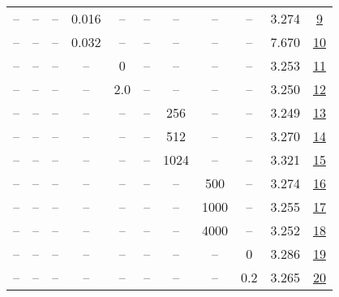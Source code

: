 \begin{table}[H]
\begin{tabular}{ccccccccccc}
-- & -- & -- & 0.016 & -- & -- & -- & -- & -- & 3.274 & \href{https://wandb.ai/stanford-mercury/optimizer-scaling/runs/sweep-130m-21B-nadamwa4d8belr0.016-wd0.1-minlr0-warmup2000-b10.9-d5c520}{9} \\
-- & -- & -- & 0.032 & -- & -- & -- & -- & -- & 7.670 & \href{https://wandb.ai/stanford-mercury/optimizer-scaling/runs/sweep-130m-21B-nadamwe5520alr0.032-wd0.1-minlr0-warmup2000-b10.9-07e730}{10} \\
-- & -- & -- & -- & 0 & -- & -- & -- & -- & 3.253 & \href{https://wandb.ai/stanford-mercury/optimizer-scaling/runs/sweep-130m-21B-nadamw3e1122lr0.008-wd0.1-minlr0-warmup2000-b10.9-046f4c}{11} \\
-- & -- & -- & -- & 2.0 & -- & -- & -- & -- & 3.250 & \href{https://wandb.ai/stanford-mercury/optimizer-scaling/runs/sweep-130m-21B-nadamw9cf59alr0.008-wd0.1-minlr0-warmup2000-b10.9-325d49}{12} \\
-- & -- & -- & -- & -- & -- & 256 & -- & -- & 3.249 & \href{https://wandb.ai/stanford-mercury/optimizer-scaling/runs/sweep-130m-21B-nadamwaee88elr0.008-wd0.1-minlr0-warmup2000-b10.9-67ec21}{13} \\
-- & -- & -- & -- & -- & -- & 512 & -- & -- & 3.270 & \href{https://wandb.ai/stanford-mercury/optimizer-scaling/runs/sweep-130m-21B-nadamw1c5657lr0.008-wd0.1-minlr0-warmup2000-b10.9-7ae1bd}{14} \\
-- & -- & -- & -- & -- & -- & 1024 & -- & -- & 3.321 & \href{https://wandb.ai/stanford-mercury/optimizer-scaling/runs/sweep-130m-21B-nadamw96aba0lr0.008-wd0.1-minlr0-warmup2000-b10.9-70c7d9}{15} \\
-- & -- & -- & -- & -- & -- & -- & 500 & -- & 3.274 & \href{https://wandb.ai/stanford-mercury/optimizer-scaling/runs/sweep-130m-21B-nadamw2fe9a1lr0.008-wd0.1-minlr0-warmup500-b10.95-2fd100}{16} \\
-- & -- & -- & -- & -- & -- & -- & 1000 & -- & 3.255 & \href{https://wandb.ai/stanford-mercury/optimizer-scaling/runs/sweep-130m-21B-nadamwcc80a2lr0.008-wd0.1-minlr0-warmup1000-b10.9-9cc711}{17} \\
-- & -- & -- & -- & -- & -- & -- & 4000 & -- & 3.252 & \href{https://wandb.ai/stanford-mercury/optimizer-scaling/runs/sweep-130m-21B-nadamwecfbe6lr0.008-wd0.1-minlr0-warmup4000-b10.9-5679b9}{18} \\
-- & -- & -- & -- & -- & -- & -- & -- & 0 & 3.286 & \href{https://wandb.ai/stanford-mercury/optimizer-scaling/runs/sweep-130m-21B-nadamw4cd581lr0.008-wd0-minlr0-warmup2000-b10.95--646f8d}{19} \\
-- & -- & -- & -- & -- & -- & -- & -- & 0.2 & 3.265 & \href{https://wandb.ai/stanford-mercury/optimizer-scaling/runs/sweep-130m-21B-nadamw602ff2lr0.008-wd0.2-minlr0-warmup2000-b10.9-577a26}{20} \\
\bottomrule
\end{tabular}
\end{table}

